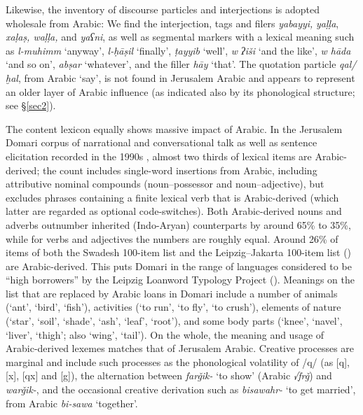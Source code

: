 \documentclass[output=paper]{langsci/langscibook}
\begin{document}
Likewise, the inventory of discourse particles and interjections is adopted wholesale from Arabic: We find the interjection, tags and filers \textit{yabayyi,} \textit{yaḷḷa}, \textit{xaḷaṣ, waḷḷa,} {{and}} \textit{yaʕni}, as well as segmental markers with a lexical meaning such as \textit{l-muhimm} ‘anyway’, \textit{l-ḥāṣil} ‘finally’, \textit{ṭayyib} ‘well’, \textit{w ʔiši} ‘and the like’, \textit{w hāda} ‘and so on’, \textit{abṣar} ‘whatever’, and the filler \textit{hāy} ‘that’. The quotation particle \textit{qal/ḫal}, from Arabic ‘say’, is not found in Jerusalem Arabic and appears to represent an older layer of Arabic influence (as indicated also by its phonological structure; see §\ref{sec2}). 

The content lexicon equally shows massive impact of Arabic. In the Jerusalem Domari corpus of narrational and conversational talk as well as sentence elicitation recorded in the 1990s \citep{Matras2012}, almost two thirds of lexical items are Arabic-derived; the count includes single-word insertions from Arabic, including attributive nominal compounds (noun–possessor and noun–adjective), but excludes phrases containing a finite lexical verb that is Arabic-derived (which latter are regarded as optional code-switches). Both Arabic-derived nouns and adverbs outnumber inherited (Indo-Aryan) counterparts by around 65\% to 35\%, while for verbs and adjectives the numbers are roughly equal. Around 26\% of items of both the Swadesh 100-item list and the Leipzig–Jakarta 100-item list (\citealt{HaspelmathTadmor2009}) are Arabic-derived. This puts Domari in the range of languages considered to be ``high borrowers'' by the Leipzig Loanword Typology Project (\citealt{HaspelmathTadmor2009}). Meanings on the list that are replaced by Arabic loans in Domari include a number of animals (‘ant’, ‘bird’, ‘fish’), activities (‘to run’, ‘to fly’, ‘to crush’), elements of nature (‘star’, ‘soil’, ‘shade’, ‘ash’, ‘leaf’, ‘root’), and some body parts (‘knee’, ‘navel’, ‘liver’, ‘thigh’; also ‘wing’, ‘tail’). On the whole, the meaning and usage of Arabic-derived lexemes matches that of Jerusalem Arabic. Creative processes are marginal and include such processes as the phonological volatility of /q/ (as [q], [x], [qx] and [g]), the alternation between \textit{farǧik-} ‘to show’ (Arabic \textit{√frǧ}) and \textit{warǧik-}, and the occasional creative derivation such as \textit{bisawahr-} ‘to get married’, from Arabic \textit{bi-sawa} ‘together’. 
\end{document}

